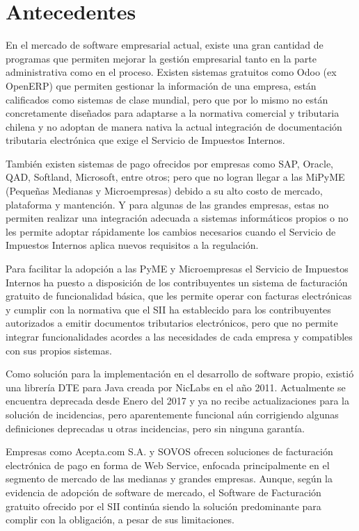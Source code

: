 \section{Antecedentes}

En el mercado de software empresarial actual, existe una gran cantidad de programas que permiten mejorar la gestión empresarial tanto en la parte administrativa como en el proceso. Existen sistemas gratuitos como Odoo (ex OpenERP) que permiten gestionar la información de una empresa, están calificados como sistemas  de clase mundial, pero que por lo mismo no están concretamente diseñados para adaptarse a la normativa comercial y tributaria chilena y no adoptan de manera nativa la actual integración de documentación tributaria electrónica que exige el Servicio de Impuestos Internos.

También existen sistemas de pago ofrecidos por empresas como SAP, Oracle, QAD, Softland, Microsoft, entre otros; pero que no logran llegar a las MiPyME (Pequeñas Medianas y Microempresas) debido a su alto costo de mercado, plataforma y mantención. Y para algunas de las grandes empresas, estas no permiten realizar una integración adecuada a sistemas informáticos propios o no les permite adoptar rápidamente los cambios necesarios cuando el Servicio de Impuestos Internos aplica nuevos requisitos a la regulación.

Para facilitar la adopción a las PyME y Microempresas el Servicio de Impuestos Internos ha puesto a disposición de los contribuyentes un sistema de facturación gratuito de funcionalidad básica, que les permite operar con facturas electrónicas y cumplir con la normativa que el SII ha establecido para los contribuyentes autorizados a emitir documentos tributarios electrónicos, pero que no permite integrar funcionalidades acordes a las necesidades de cada empresa y compatibles con sus propios sistemas.

Como solución para la implementación en el desarrollo de software propio, existió una librería DTE para Java creada por NicLabs en el año 2011. Actualmente se encuentra deprecada desde Enero del 2017 y ya no recibe actualizaciones para la solución de incidencias, pero aparentemente funcional aún corrigiendo algunas definiciones deprecadas u otras incidencias, pero sin ninguna garantía.

Empresas como Acepta.com S.A. y SOVOS ofrecen soluciones de facturación electrónica de pago en forma de Web Service, enfocada principalmente en el segmento de mercado de las medianas y grandes empresas. Aunque, según la evidencia de adopción de software de mercado, el Software de Facturación gratuito ofrecido por el SII continúa siendo la solución predominante para complir con la obligación, a pesar de sus limitaciones.

